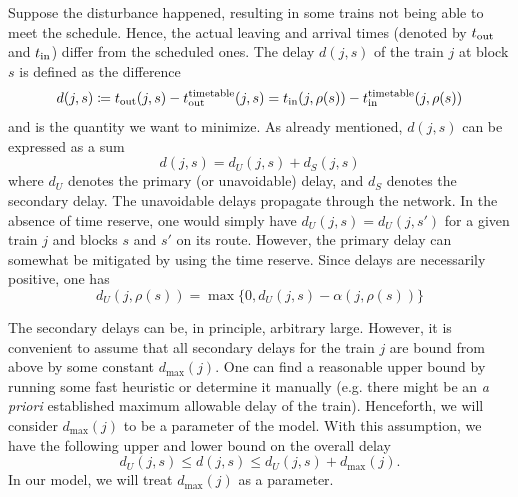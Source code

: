 Suppose the disturbance happened, resulting in some trains not being able to meet the schedule.
Hence, the actual leaving and arrival times (denoted by $t_\text{out}$ and $t_\text{in}$) differ from the
scheduled ones. The delay $d(j, s)$ of the train $j$ at block $s$ is defined as the difference
\begin{equation}
\label{eq:djs}
d(j, s) \coloneqq t_\text{out}(j, s) - t_\text{out}^\text{timetable}(j, s) = t_\text{in}(j, \rho(s)) - t_\text{in}^\text{timetable}(j, \rho(s))
\end{equation}
and is the quantity we want to minimize. As already mentioned, $d(j, s)$ can be expressed as a sum
\begin{equation}
d(j, s) = d_U(j, s) + d_S(j, s)
\end{equation}
where $d_U$ denotes the primary (or unavoidable) delay, and $d_S$ denotes the secondary delay. The
unavoidable delays propagate through the network. In the absence of time reserve, one would simply
have $d_U(j, s) = d_U(j, s')$ for a given train $j$ and blocks $s$ and $s'$ on its route. However,
the primary delay can somewhat be mitigated by using the time reserve. Since delays are necessarily
positive, one has
\begin{equation}
    d_U(j, \rho(s)) = \max\{0, d_U(j, s) - \alpha(j, \rho(s))\}
\end{equation}

The secondary delays can be, in principle, arbitrary large. However, it is convenient to assume that
all secondary delays for the train $j$ are bound from above by some constant $d_{\max}(j)$. One can find
a reasonable upper bound by running some fast heuristic or determine it manually (e.g. there might
be an \emph{a priori} established maximum allowable delay of the train). Henceforth, we will consider
$d_{\max}(j)$ to be a parameter of the model. With this assumption, we have the following upper and
lower bound on the overall delay
\begin{equation}
d_U(j, s) \le d(j, s) \le d_U(j, s) + d_{\max}(j).
\end{equation}
In our model, we will treat $d_{\max}(j)$ as a parameter.

